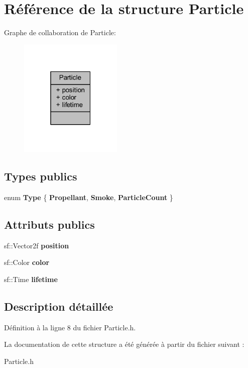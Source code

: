 \hypertarget{struct_particle}{}\section{Référence de la structure Particle}
\label{struct_particle}


Graphe de collaboration de Particle\+:\nopagebreak
\begin{figure}[H]
\begin{center}
\leavevmode
\includegraphics[width=139pt]{struct_particle__coll__graph}
\end{center}
\end{figure}
\subsection*{Types publics}
\begin{DoxyCompactItemize}
\item 
\hypertarget{struct_particle_aa27c7e68459c587570d108f511ea353e}{}\label{struct_particle_aa27c7e68459c587570d108f511ea353e} 
enum {\bfseries Type} \{ {\bfseries Propellant}, 
{\bfseries Smoke}, 
{\bfseries Particle\+Count}
 \}
\end{DoxyCompactItemize}
\subsection*{Attributs publics}
\begin{DoxyCompactItemize}
\item 
\hypertarget{struct_particle_ae3a38445c8cda2ae6e8b95b7d4d800c5}{}\label{struct_particle_ae3a38445c8cda2ae6e8b95b7d4d800c5} 
sf\+::\+Vector2f {\bfseries position}
\item 
\hypertarget{struct_particle_ac4b0b63df626ccb45334c7df7a6ca446}{}\label{struct_particle_ac4b0b63df626ccb45334c7df7a6ca446} 
sf\+::\+Color {\bfseries color}
\item 
\hypertarget{struct_particle_a160dfae711f857869ddf279cc745a350}{}\label{struct_particle_a160dfae711f857869ddf279cc745a350} 
sf\+::\+Time {\bfseries lifetime}
\end{DoxyCompactItemize}


\subsection{Description détaillée}


Définition à la ligne 8 du fichier Particle.\+h.



La documentation de cette structure a été générée à partir du fichier suivant \+:\begin{DoxyCompactItemize}
\item 
Particle.\+h\end{DoxyCompactItemize}

